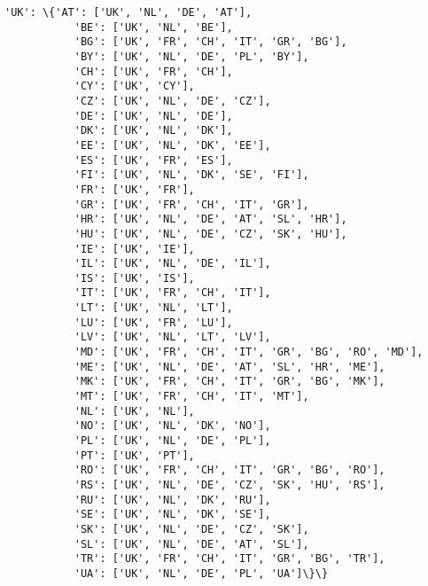 \documentclass[11pt]{article}
\begin{document}
\begin{Verbatim}[commandchars=\\\{\}]
          'UK': \{'AT': ['UK', 'NL', 'DE', 'AT'],
           'BE': ['UK', 'NL', 'BE'],
           'BG': ['UK', 'FR', 'CH', 'IT', 'GR', 'BG'],
           'BY': ['UK', 'NL', 'DE', 'PL', 'BY'],
           'CH': ['UK', 'FR', 'CH'],
           'CY': ['UK', 'CY'],
           'CZ': ['UK', 'NL', 'DE', 'CZ'],
           'DE': ['UK', 'NL', 'DE'],
           'DK': ['UK', 'NL', 'DK'],
           'EE': ['UK', 'NL', 'DK', 'EE'],
           'ES': ['UK', 'FR', 'ES'],
           'FI': ['UK', 'NL', 'DK', 'SE', 'FI'],
           'FR': ['UK', 'FR'],
           'GR': ['UK', 'FR', 'CH', 'IT', 'GR'],
           'HR': ['UK', 'NL', 'DE', 'AT', 'SL', 'HR'],
           'HU': ['UK', 'NL', 'DE', 'CZ', 'SK', 'HU'],
           'IE': ['UK', 'IE'],
           'IL': ['UK', 'NL', 'DE', 'IL'],
           'IS': ['UK', 'IS'],
           'IT': ['UK', 'FR', 'CH', 'IT'],
           'LT': ['UK', 'NL', 'LT'],
           'LU': ['UK', 'FR', 'LU'],
           'LV': ['UK', 'NL', 'LT', 'LV'],
           'MD': ['UK', 'FR', 'CH', 'IT', 'GR', 'BG', 'RO', 'MD'],
           'ME': ['UK', 'NL', 'DE', 'AT', 'SL', 'HR', 'ME'],
           'MK': ['UK', 'FR', 'CH', 'IT', 'GR', 'BG', 'MK'],
           'MT': ['UK', 'FR', 'CH', 'IT', 'MT'],
           'NL': ['UK', 'NL'],
           'NO': ['UK', 'NL', 'DK', 'NO'],
           'PL': ['UK', 'NL', 'DE', 'PL'],
           'PT': ['UK', 'PT'],
           'RO': ['UK', 'FR', 'CH', 'IT', 'GR', 'BG', 'RO'],
           'RS': ['UK', 'NL', 'DE', 'CZ', 'SK', 'HU', 'RS'],
           'RU': ['UK', 'NL', 'DK', 'RU'],
           'SE': ['UK', 'NL', 'DK', 'SE'],
           'SK': ['UK', 'NL', 'DE', 'CZ', 'SK'],
           'SL': ['UK', 'NL', 'DE', 'AT', 'SL'],
           'TR': ['UK', 'FR', 'CH', 'IT', 'GR', 'BG', 'TR'],
           'UA': ['UK', 'NL', 'DE', 'PL', 'UA']\}\}
\end{Verbatim}
            

    
    
    
    
\end{document}
